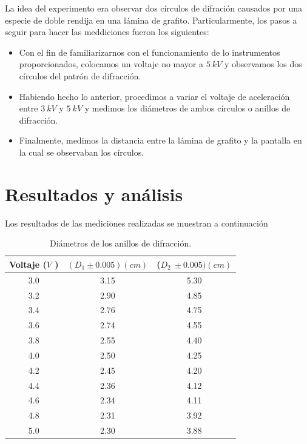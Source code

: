\documentclass[prb,aps,twocolumn,preprintnumbers,amsmath,amssymb]{revtex4}
\begin{document}
La idea del experimento era observar dos círculos de difración causados por una especie de doble rendija en una lámina de grafito. Particularmente, los pasos a seguir para hacer las meddiciones fueron los siguientes:

\begin{itemize}
	\item Con el fin de familiarizarnos con el funcionamiento de lo instrumentos proporcionados, colocamos un voltaje no mayor a $5\ kV$ y observamos los dos círculos del patrón de difracción. 
	
	\item Habiendo hecho lo anterior, procedimos a variar el voltaje de aceleración entre $3\ kV$ y $5\ kV$ y medimos los diámetros de ambos círculos o anillos de difracción.
	
	\item Finalmente, medimos la distancia entre la lámina de grafito y la pantalla en la cual se observaban los círculos.
\end{itemize}

\section{Resultados y análisis}

Los resultados de las mediciones realizadas se muestran a continuación

\begin{table}[h!]
	\caption{\label{Tabla 1}Diámetros de los anillos de difracción.}
	\begin{ruledtabular}
		\begin{tabular}{|ccc|}
			Voltaje ($V$ ) & $(D_{1} \pm 0.005)(cm)$ & ($D_{2}\ \pm 0.005)(cm)$\\
			\hline
			3.0 & 3.15 & 5.30\\
			3.2 & 2.90 & 4.85\\
			3.4 & 2.76 & 4.75\\
			3.6 & 2.74 & 4.55\\
			3.8 & 2.55 & 4.40\\
			4.0 & 2.50 & 4.25\\
			4.2 & 2.45 & 4.20\\
			4.4 & 2.36 & 4.12\\
			4.6 & 2.34 & 4.11\\
			4.8 & 2.31 & 3.92\\
			5.0 & 2.30 & 3.88\\
		\end{tabular}
	\end{ruledtabular}
\end{table}
\
\\\\\\\\\\
\end{document}
